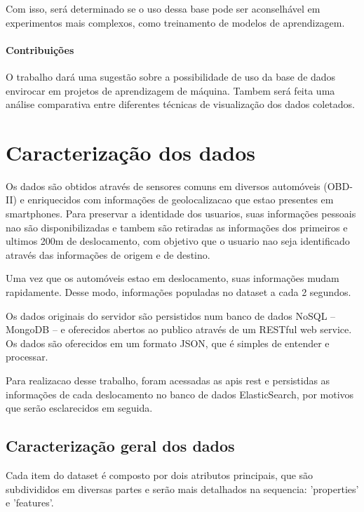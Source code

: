 \documentclass[10pt, conference]{IEEEtran}
\begin{document}
Com isso, será determinado se o uso dessa base pode ser aconselhável
em experimentos mais complexos, como 
treinamento de modelos de aprendizagem. 

\paragraph*{Contribuições}
%
O trabalho dará uma sugestão sobre a possibilidade de uso da base de dados
envirocar em projetos de aprendizagem de máquina. Tambem será feita uma
análise comparativa entre diferentes técnicas de visualização dos dados
coletados.


\section{Caracterização dos dados}
%

Os dados são obtidos através de sensores comuns em diversos
automóveis (OBD-II) e enriquecidos com informações de geolocalizacao
que estao presentes em smartphones. Para preservar a identidade
dos usuarios, suas informações pessoais nao são disponibilizadas e tambem
são retiradas as informações dos primeiros e ultimos 200m de deslocamento,
com objetivo que o usuario nao seja identificado através das informações
de origem e de destino. 

Uma vez que os automóveis estao em deslocamento, suas informações mudam
rapidamente. Desse modo, informações populadas no dataset a cada 2 segundos.

Os dados originais do servidor são persistidos num banco de dados NoSQL -- 
MongoDB -- e oferecidos abertos ao publico através de um RESTful web service.
Os dados são oferecidos em um formato JSON, que é simples de entender e processar.

Para realizacao desse trabalho, foram acessadas as apis rest e persistidas
as informações de cada deslocamento no banco de dados ElasticSearch, por 
motivos que serão esclarecidos em seguida. 



\subsection{Caracterização geral dos dados}

Cada item do dataset é composto por dois atributos principais, que são subdivididos
em diversas partes e serão mais detalhados na sequencia: 'properties' e 'features'. 
\end{document}
